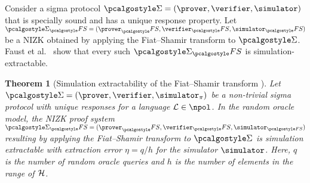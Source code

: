 \documentclass[runningheads,11pt]{llncs}
\newtheorem{theorem}{Theorem}%
\theoremstyle{definition}
\newtheorem{definition}[theorem]{Definition}
\begin{document}

Consider a sigma protocol $\sigmaprot = (\prover, \verifier, \simulator)$ that
is specially sound and has a unique response property. Let $\sigmaprot_\fs = (\prover_\fs, \verifier_\fs, \simulator_\fs)$ be a NIZK obtained by applying the Fiat--Shamir transform to $\sigmaprot$.
Faust et al.~\cite{INDOCRYPT:FKMV12} show that every such $\sigmaprot_\fs$ is simulation-extractable.

\begin{theorem}[Simulation extractability of the Fiat--Shamir transform \cite{INDOCRYPT:FKMV12}]
	Let $\sigmaprot = (\prover, \verifier, \simulator_\zkproof)$ be a non-trivial sigma protocol with unique responses for a language $\LANG \in \npol$.
	In the random oracle model, the NIZK proof system $\sigmaprot_\fs = (\prover_\fs, \verifier_\fs, \simulator_{\fs})$ resulting by applying the Fiat--Shamir transform to $\sigmaprot$ is simulation extractable with extraction error $\eta = q/h$ for the simulator $\simulator$. Here, $q$ is the number of random oracle queries and $h$ is the number of elements in the range of $\mathcal{H}$.
\end{theorem}
\end{document}
